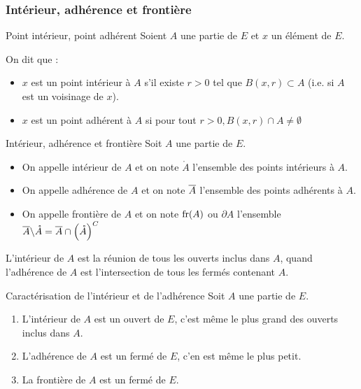     \subsubsection{Intérieur, adhérence et frontière}

    \begin{defi}{Point intérieur, point adhérent}{}
        Soient $A$ une partie de $E$ et $x$ un élément de $E$.

        On dit que :
        \begin{itemize}
            \item $x$ est un point intérieur à $A$ s’il existe $r > 0$ tel que $B(x,r) \subset A$ (i.e. si $A$ est un voisinage de $x$).
            \item $x$ est un point adhérent à $A$ si pour tout $r > 0, B(x,r) \cap A \neq \emptyset$
        \end{itemize}
    \end{defi}

    \begin{defi}{Intérieur, adhérence et frontière}
        Soit $A$ une partie de $E$.
        \begin{itemize}
            \item On appelle intérieur de $A$ et on note $\mathring{A}$ l’ensemble des points intérieurs à $A$.
            \item On appelle adhérence de $A$ et on note $\overline{A}$ l’ensemble des points adhérents à $A$.
            \item On appelle frontière de $A$ et on note $\operatorname{fr}(A)$ ou $\partial A$ l’ensemble $\overline{A} \backslash \mathring{A} = \overline{A} \cap \left(\mathring{A}\right)^C$
        \end{itemize}
    \end{defi}

    L’intérieur de $A$ est la réunion de tous les ouverts inclus dans $A$, quand l’adhérence de $A$ est l’intersection de tous les fermés contenant $A$.

    \begin{prop}{Caractérisation de l’intérieur et de l’adhérence}
        Soit $A$ une partie de $E$.
        \begin{enumerate}
            \item L’intérieur de $A$ est un ouvert de $E$, c’est même le plus grand des ouverts inclus dans $A$.
            \item L’adhérence de $A$ est un fermé de $E$, c’en est même le plus petit.
            \item La frontière de $A$ est un fermé de $E$.
        \end{enumerate}
    \end{prop}

